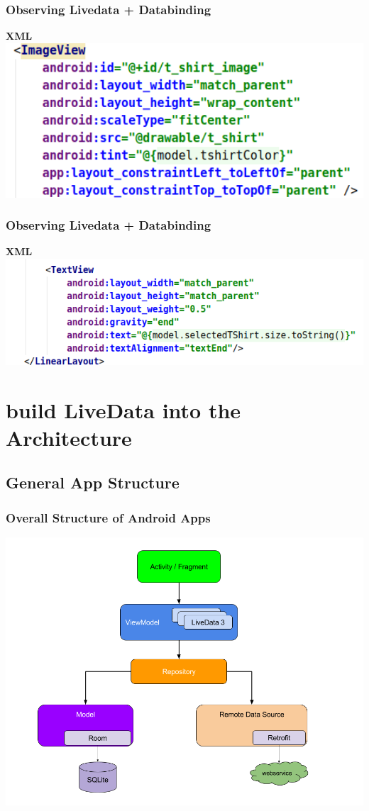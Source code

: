 \documentclass{beamer}
\begin{document}
	\begin{frame}	
	\frametitle{Observing Livedata + Databinding}
	\textbf{XML}
	\includegraphics[width=1\textwidth]{DataBindingInImageView.png}
	\end{frame}
	
	\begin{frame}	
	\frametitle{Observing Livedata + Databinding}
	\textbf{XML}
	\includegraphics[width=1\textwidth]{DataBindingInTextView.png}
	\end{frame}
	
	\section[App Structure]{build LiveData into the Architecture}
	\subsection[General]{General App Structure}
	\begin{frame}
		\frametitle{Overall Structure of Android Apps}
		\includegraphics[width=1\textwidth]{architecture.png}
	\end{frame}
	
\end{document}
